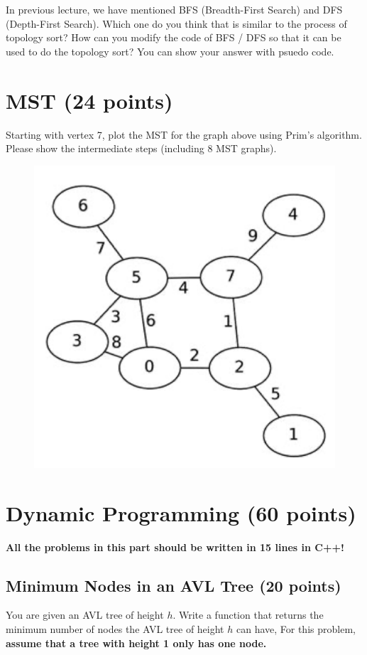 \documentclass[11pt]{exam}
\begin{document}
In previous lecture, we have mentioned BFS (Breadth-First Search) and DFS (Depth-First Search). Which one do you think that is similar to the process of topology sort? How can you modify the code of BFS / DFS so that it can be used to do the topology sort? You can show your answer with psuedo code.

\begin{solution}
\end{solution}
\section{MST (24 points)}

Starting with vertex 7, plot the MST for the graph above using Prim’s algorithm.
Please show the intermediate steps (including 8 MST graphs).

\begin{figure}[htp]
\centering
\includegraphics[width=.4\linewidth]{mst.png}
\end{figure}

\begin{solution}
\end{solution}

\newpage
\section{Dynamic Programming (60 points)}
\textbf{\huge\color{red}All the problems in this part should be written in 15 lines in C++!}
\subsection{Minimum Nodes in an AVL Tree (20 points)}
You are given an AVL tree of height $h$. Write a function that returns the minimum number of nodes the AVL tree of height $h$ can have, For this problem, \textbf{assume that a tree with height 1 only has one node.}\\
\end{document}

